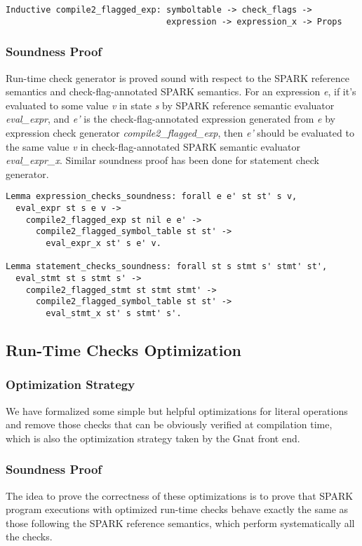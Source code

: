 \begin{lstlisting}[escapechar=\#, language=coq, basicstyle=\small] 
Inductive compile2_flagged_exp: symboltable -> check_flags -> 
                                expression -> expression_x -> Props
\end{lstlisting}

\subsubsection{Soundness Proof}
Run-time check generator is proved sound with respect to the SPARK reference
semantics and check-flag-annotated SPARK semantics. For an expression
\textit{e}, if it's evaluated to some value \textit{v} in state \textit{s} by
SPARK reference semantic evaluator \textit{eval\_expr}, and \textit{e'} is the
check-flag-annotated expression generated from \textit{e} by expression check
generator \textit{compile2\_flagged\_exp}, then \textit{e'} should be evaluated
to the same value \textit{v} in check-flag-annotated SPARK semantic evaluator
\textit{eval\_expr\_x}. Similar soundness proof has been done for statement
check generator.

\begin{lstlisting}[escapechar=\#, language=coq, basicstyle=\small]
Lemma expression_checks_soundness: forall e e' st st' s v,
  eval_expr st s e v ->
    compile2_flagged_exp st nil e e' ->
      compile2_flagged_symbol_table st st' ->
        eval_expr_x st' s e' v.
        
Lemma statement_checks_soundness: forall st s stmt s' stmt' st',
  eval_stmt st s stmt s' -> 
    compile2_flagged_stmt st stmt stmt' ->
      compile2_flagged_symbol_table st st' ->
        eval_stmt_x st' s stmt' s'.
\end{lstlisting}

\subsection{Run-Time Checks Optimization}
\subsubsection{Optimization Strategy}
We have formalized some simple but helpful optimizations for literal operations
and remove those checks that can be obviously verified at compilation time,
which is also the optimization strategy taken by the Gnat front end. 

\subsubsection{Soundness Proof}
The idea to prove the correctness of these optimizations is to prove that SPARK
program executions with optimized run-time checks behave exactly the same as
those following the SPARK reference semantics, which perform systematically all
the checks.

